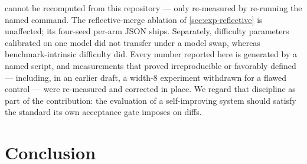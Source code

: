 \documentclass{article}
\begin{document}
cannot be recomputed from this repository --- only re-measured by re-running the named command. The reflective-merge ablation of \cref{sec:exp-reflective} is unaffected; its four-seed per-arm JSON ships. Separately, difficulty parameters calibrated on one model did not transfer under a model swap, whereas benchmark-intrinsic difficulty did. Every number reported here is generated by a named script, and measurements that proved irreproducible or favorably defined --- including, in an earlier draft, a width-8 experiment withdrawn for a flawed control --- were re-measured and corrected in place. We regard that discipline as part of the contribution: the evaluation of a self-improving system should satisfy the standard its own acceptance gate imposes on diffs.

\section{Conclusion}
\label{sec:conclusion}
\end{document}

